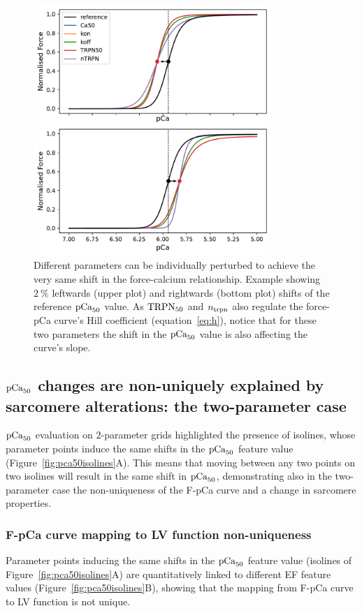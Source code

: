 \begin{figure}[h!]
    \myfloatalign
    \includegraphics[width=0.8\textwidth]{figures/chapter08/Fig4.pdf}
    \caption{Different parameters can be individually perturbed to achieve the very same shift in the force-calcium relationship. Example showing $\SI{2}{\percent}$ leftwards (upper plot) and rightwards (bottom plot) shifts of the reference $\textrm{pCa}_{50}$ value. As $\textrm{TRPN}_{50}$ and $n_{\textrm{trpn}}$ also regulate the force-pCa curve's Hill coefficient (equation~\eqref{eq:h}), notice that for these two parameters the shift in the $\textrm{pCa}_{50}$ value is also affecting the curve's slope.}
    \label{fig:2perclwrwshift}
\end{figure}


%
%
%
\subsection{$\textrm{pCa}_{50}$ changes are non-uniquely explained by sarcomere alterations: the two-parameter case}\label{sec:changespCa50result2}
$\textrm{pCa}_{50}$ evaluation on $2$-parameter grids highlighted the presence of isolines, whose parameter points induce the same shifts in the $\textrm{pCa}_{50}$ feature value (Figure~\ref{fig:pca50isolines}A). This means that moving between any two points on two isolines will result in the same shift in $\textrm{pCa}_{50}$, demonstrating also in the two-parameter case the non-uniqueness of the F-pCa curve and a change in sarcomere properties.


%
%
%
\subsubsection{F-pCa curve mapping to LV function non-uniqueness}\label{sec:fpcatolvnonuniquemapping}
Parameter points inducing the same shifts in the $\textrm{pCa}_{50}$ feature value (isolines of Figure~\ref{fig:pca50isolines}A) are quantitatively linked to different EF feature values (Figure~\ref{fig:pca50isolines}B), showing that the mapping from F-pCa curve to LV function is not unique.

